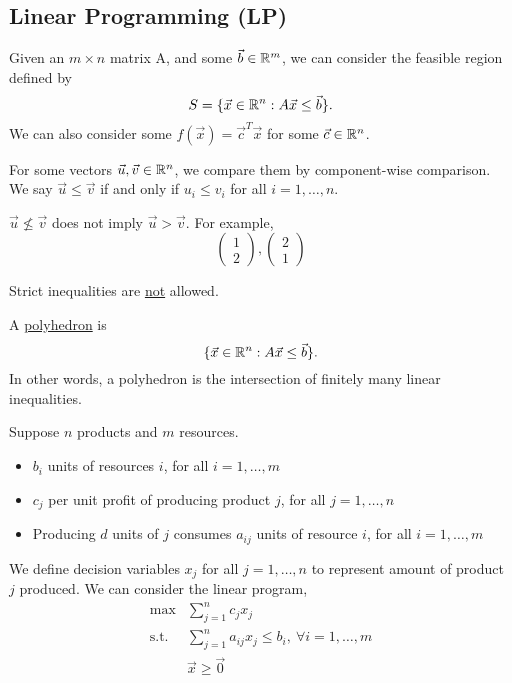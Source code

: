 \documentclass[11pt]{article}
\begin{document}
\subsection{Linear Programming (LP)}
Given an $m \times n$ matrix A, and some $\vec b \in \mathbb{R}^m $, we can consider the
feasible region defined by
\begin{equation*}
S =\{\vec x \in \mathbb{R}^n: A\vec x \leq \vec b\}.
\end{equation*}
We can also consider some $f(\vec x) = \vec{c}^T \vec x$ for some $\vec c \in \mathbb{R}^n$.
\begin{definition}
For some vectors $\vec u,\vec v \in \mathbb{R}^n$, we compare them by component-wise comparison.
We say \underline{$\vec u \leq \vec v$} if and only if $u_i \leq v_i$ for all
$i = 1, \dots, n$. 
\end{definition}
\begin{remark}
$\vec u \not\leq \vec v$ does not imply $\vec u > \vec v$. For example,
\begin{equation*}
\begin{pmatrix}
1 \\ 2
\end{pmatrix}
,
\begin{pmatrix}
2 \\ 1
\end{pmatrix}
\end{equation*}
\end{remark}
\begin{remark}
Strict inequalities are \underline{not} allowed.
\end{remark}
\begin{definition}
A \underline{polyhedron} is
\begin{equation*}
\{\vec x \in \mathbb{R}^n: A\vec x \leq \vec b\}.
\end{equation*}
In other words, a polyhedron is the intersection of finitely many linear
inequalities.
\end{definition}
\begin{example}
Suppose $n$ products and $m$ resources.
\begin{itemize}
\item $b_i$ units of resources $i$, for all $i = 1, \dots, m$
\item $c_j$ per unit profit of producing product $j$, for all $j = 1, \dots, n$
\item Producing $d$ units of $j$ consumes $a_{ij}$ units of resource $i$, for
all $i = 1,\dots,m$
\end{itemize}
We define decision variables $x_j$ for all $j = 1,\dots,n$ to represent amount
of product $j$ produced. We can consider the linear program,
\begin{align*}
\max &\sum^n_{j=1} c_jx_j\\
\text{s.t.} & \sum^n_{j=1} a_{ij}x_j \leq b_i,\> \forall i = 1,\dots,m\\
& \vec x \geq \vec 0
\end{align*}
\end{example}
\end{document}
